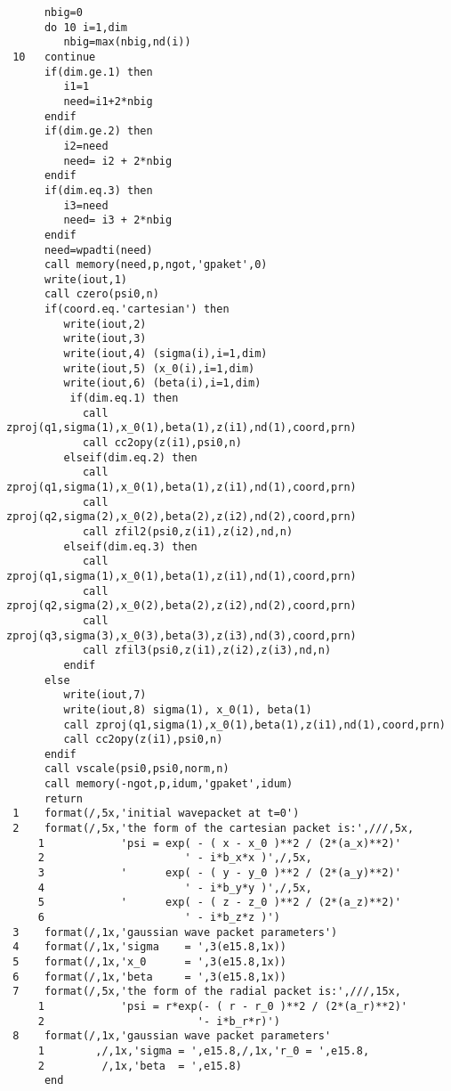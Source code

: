 \documentclass{article}
\begin{document}
\begin{verbatim}
      nbig=0
      do 10 i=1,dim
         nbig=max(nbig,nd(i))
 10   continue   
      if(dim.ge.1) then
         i1=1
         need=i1+2*nbig
      endif
      if(dim.ge.2) then
         i2=need
         need= i2 + 2*nbig
      endif
      if(dim.eq.3) then
         i3=need
         need= i3 + 2*nbig
      endif  
      need=wpadti(need)
      call memory(need,p,ngot,'gpaket',0)
      write(iout,1)
      call czero(psi0,n)
      if(coord.eq.'cartesian') then
         write(iout,2)
         write(iout,3)
         write(iout,4) (sigma(i),i=1,dim)
         write(iout,5) (x_0(i),i=1,dim)
         write(iout,6) (beta(i),i=1,dim)
          if(dim.eq.1) then
            call zproj(q1,sigma(1),x_0(1),beta(1),z(i1),nd(1),coord,prn)
            call cc2opy(z(i1),psi0,n)
         elseif(dim.eq.2) then
            call zproj(q1,sigma(1),x_0(1),beta(1),z(i1),nd(1),coord,prn)
            call zproj(q2,sigma(2),x_0(2),beta(2),z(i2),nd(2),coord,prn)
            call zfil2(psi0,z(i1),z(i2),nd,n)
         elseif(dim.eq.3) then
            call zproj(q1,sigma(1),x_0(1),beta(1),z(i1),nd(1),coord,prn)
            call zproj(q2,sigma(2),x_0(2),beta(2),z(i2),nd(2),coord,prn)
            call zproj(q3,sigma(3),x_0(3),beta(3),z(i3),nd(3),coord,prn)
            call zfil3(psi0,z(i1),z(i2),z(i3),nd,n)
         endif
      else
         write(iout,7)
         write(iout,8) sigma(1), x_0(1), beta(1)
         call zproj(q1,sigma(1),x_0(1),beta(1),z(i1),nd(1),coord,prn)
         call cc2opy(z(i1),psi0,n)
      endif
      call vscale(psi0,psi0,norm,n)
      call memory(-ngot,p,idum,'gpaket',idum) 
      return
 1    format(/,5x,'initial wavepacket at t=0')
 2    format(/,5x,'the form of the cartesian packet is:',///,5x,
     1            'psi = exp( - ( x - x_0 )**2 / (2*(a_x)**2)'
     2                      ' - i*b_x*x )',/,5x,    
     3            '      exp( - ( y - y_0 )**2 / (2*(a_y)**2)'
     4                      ' - i*b_y*y )',/,5x,    
     5            '      exp( - ( z - z_0 )**2 / (2*(a_z)**2)'
     6                      ' - i*b_z*z )')    
 3    format(/,1x,'gaussian wave packet parameters')
 4    format(/,1x,'sigma    = ',3(e15.8,1x))
 5    format(/,1x,'x_0      = ',3(e15.8,1x))
 6    format(/,1x,'beta     = ',3(e15.8,1x))
 7    format(/,5x,'the form of the radial packet is:',///,15x,
     1            'psi = r*exp(- ( r - r_0 )**2 / (2*(a_r)**2)'
     2                        '- i*b_r*r)')
 8    format(/,1x,'gaussian wave packet parameters'
     1        ,/,1x,'sigma = ',e15.8,/,1x,'r_0 = ',e15.8,
     2         /,1x,'beta  = ',e15.8)
      end       
\end{verbatim}
\end{document}
